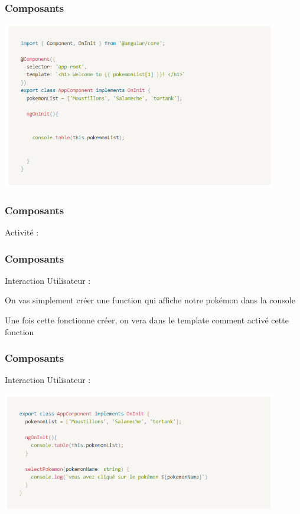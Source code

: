 \documentclass[10pt]{beamer}
\begin{document}
	\begin{frame}
		\frametitle{Composants}

		\centering
		\includegraphics[width=12cm]{assets/consoleTable} \newline


	\end{frame}

	\begin{frame}
		\frametitle{Composants}

		Activité : \newline \newline


	\end{frame}

	\begin{frame}
		\frametitle{Composants}

		Interaction Utilisateur : \newline \newline

		On vas simplement créer une function qui affiche notre pokémon dans la console \newline \newline

		Une fois cette fonctionne créer, on vera dans le template comment activé cette fonction


	\end{frame}

	\begin{frame}
		\frametitle{Composants}

		Interaction Utilisateur : \newline \newline


		\centering
		\includegraphics[width=12cm]{assets/userInt} \newline


	\end{frame}
\end{document}
